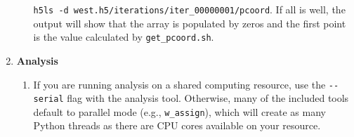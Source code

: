 \documentclass[9pt,tutorial,pubversion]{livecoms}
\begin{document}
\begin{enumerate}
\begin{enumerate}
\verb|h5ls -d west.h5/iterations/iter_00000001/pcoord|.
If all is well, the output will show that the array is populated by zeros and the first point is the value calculated by \verb|get_pcoord.sh|.
\end{enumerate}
\item \textbf{Analysis}
\begin{enumerate}
\item If you are running analysis on a shared computing resource, use the \verb|--serial| flag with the analysis tool. 
Otherwise, many of the included tools default to parallel mode (e.g., \verb|w_assign|), which will create as many Python threads as there are CPU cores available on your resource.
\end{enumerate}
\end{enumerate}
\end{document}
